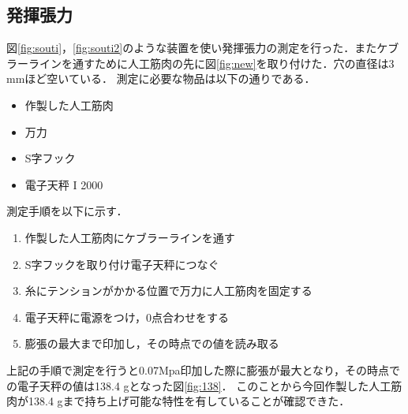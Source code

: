\subsection{発揮張力}
図\ref{fig:souti}，\ref{fig:souti2}のような装置を使い発揮張力の測定を行った．またケブラーラインを通すために人工筋肉の先に図\ref{fig:new}を取り付けた．穴の直径は3 mmほど空いている．
測定に必要な物品は以下の通りである．
\begin{itemize}
  \item 作製した人工筋肉
  \item 万力
  \item S字フック
  \item 電子天秤 I 2000
\end{itemize}
測定手順を以下に示す．
\begin{enumerate}
  \item 作製した人工筋肉にケブラーラインを通す
  \item S字フックを取り付け電子天秤につなぐ
  \item 糸にテンションがかかる位置で万力に人工筋肉を固定する
  \item 電子天秤に電源をつけ，0点合わせをする
  \item 膨張の最大まで印加し，その時点での値を読み取る
\end{enumerate}
上記の手順で測定を行うと0.07Mpa印加した際に膨張が最大となり，その時点での電子天秤の値は138.4 gとなった図\ref{fig:138}．
このことから今回作製した人工筋肉が138.4 gまで持ち上げ可能な特性を有していることが確認できた．
